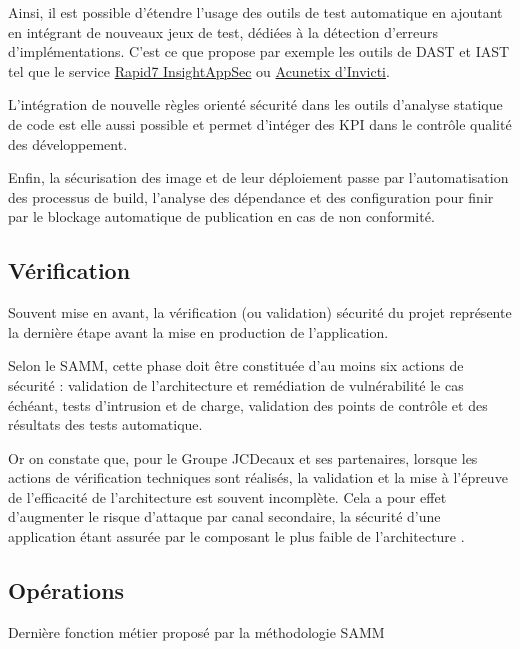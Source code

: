 Ainsi, il est possible d'étendre l'usage des outils de test automatique en ajoutant en intégrant de nouveaux jeux de test, dédiées à la 
détection d'erreurs d'implémentations.
C'est ce que propose par exemple les outils de \ac{DAST}  et \ac{IAST} tel que le service 
\href{https://www.rapid7.com/products/insightappsec/}{Rapid7 InsightAppSec} ou \href{https://www.acunetix.com/}{Acunetix d'Invicti}.

L'intégration de nouvelle règles orienté sécurité dans les outils d'analyse statique de code est elle aussi possible et permet d'intéger
des \ac{KPI} dans le contrôle qualité des développement.

Enfin, la sécurisation des image et de leur déploiement passe par l'automatisation des processus de build, l'analyse des dépendance et des
configuration pour finir par le blockage automatique de publication en cas de non conformité.

\subsection{Vérification}

Souvent mise en avant, la vérification (ou validation) sécurité du projet représente la dernière étape avant la mise en production de 
l'application. 

Selon le \ac{SAMM}, cette phase doit être constituée d'au moins six actions de sécurité : validation de l'architecture et remédiation de
vulnérabilité le cas échéant, tests d'intrusion et de charge, validation des points de contrôle et des résultats des tests automatique.

Or on constate que, pour le Groupe JCDecaux et ses partenaires, lorsque les actions de vérification techniques sont réalisés, la validation
et la mise à l'épreuve de l'efficacité de l'architecture est souvent incomplète. Cela a pour effet d'augmenter le risque d'attaque par canal
secondaire, la sécurité d'une application étant assurée par le composant le plus faible de l'architecture .

\subsection{Opérations}
Dernière fonction métier proposé par la méthodologie \ac{SAMM}